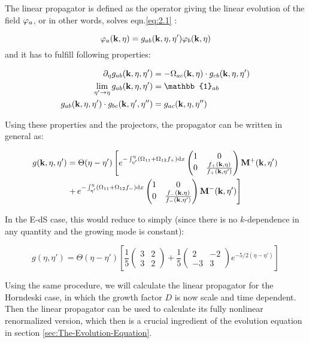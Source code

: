 The linear propagator is defined as the operator giving the linear
evolution of the field $\varphi_{a}$, or in other words, solves eqn.\ref{eq:2.1}
:

\[
\varphi_{a}(\mathbf{k},\eta)=g_{ab}(\mathbf{k},\eta,\eta')\varphi_{b}(\mathbf{k},\eta)
\]
and it has to fulfill following properties:

\begin{align*}
\pet g_{ab}(\vk k,\eta,\eta') & =-\Omega_{ac}\pkn\cdot g_{cb}(\vk k,\eta,\eta')\\
\lim_{\eta'\rightarrow\eta}g_{ab}(\vk k,\eta,\eta') & =\mathbb{1}_{ab}\\
g_{ab}(\vk k,\eta,\eta')\cdot g_{bc}(\vk k,\eta',\eta'') & =g_{ac}(\vk k,\eta,\eta'')
\end{align*}


Using these properties and the projectors, the propagator can be written
in general as:

\begin{equation}
\begin{aligned}g(\mathbf{k},\eta,\eta') & =\Theta(\eta-\eta')\left[e^{-\int_{\eta'}^{\eta}(\Omega_{11}+\Omega_{12}f_{+})\mathrm{d} x}\begin{pmatrix}1 & 0\\
0 & \frac{f_{+}(\mathbf{k},\eta)}{f_{+}(\mathbf{k},\eta')}
\end{pmatrix}\mathrm{\mathbf{M}}{}^{+}(\mathbf{k},\eta')\right.\\
 & \left.+\, e^{-\int_{\eta'}^{\eta}(\Omega_{11}+\Omega_{12}f_{-})\mathrm{d} x}\begin{pmatrix}1 & 0\\
0 & \frac{f_{-}(\mathbf{k},\eta)}{f_{-}(\mathbf{k},\eta')}
\end{pmatrix}\mathrm{\mathbf{M}}{}^{-}(\mathbf{k},\eta')\right]
\end{aligned}
\label{eq:general-propagator}
\end{equation}


In the E-dS case, this would reduce to simply (since there is no $k$-dependence
in any quantity and the growing mode is constant):

\[
g(\eta,\eta')=\Theta(\eta-\eta')\left[\frac{1}{5}\begin{pmatrix}3 & 2\\
3 & 2
\end{pmatrix}+\frac{1}{5}\begin{pmatrix}2 & -2\\
-3 & 3
\end{pmatrix}e^{-5/2(\eta-\eta')}\right]
\]


Using the same procedure, we will calculate the linear propagator
for the Horndeski case, in which the growth factor $D$ is now scale
and time dependent. Then the linear propagator can be used to calculate
its fully nonlinear renormalized version, which then is a crucial
ingredient of the evolution equation in section \ref{sec:The-Evolution-Equation}.


